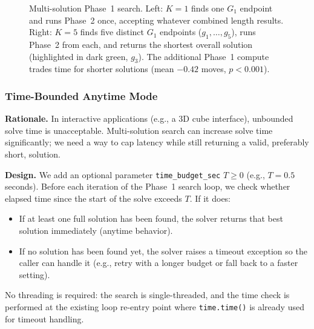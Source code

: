 \documentclass[conference]{IEEEtran}
\begin{document}
\begin{figure}[t]
\caption{Multi-solution Phase~1 search. Left: $K{=}1$ finds one $G_1$ endpoint and runs Phase~2 once, accepting whatever combined length results. Right: $K{=}5$ finds five distinct $G_1$ endpoints ($g_1,\ldots,g_5$), runs Phase~2 from each, and returns the shortest overall solution (highlighted in dark green, $g_3$). The additional Phase~1 compute trades time for shorter solutions (mean $-0.42$ moves, $p < 0.001$).}
\label{fig:multi-solution}
\end{figure}

\subsubsection{Time-Bounded Anytime Mode}
\label{sec:anytime}

\textbf{Rationale.} In interactive applications (e.g., a 3D cube interface), unbounded solve time is unacceptable. Multi-solution search can increase solve time significantly; we need a way to cap latency while still returning a valid, preferably short, solution.

\textbf{Design.} We add an optional parameter \texttt{time\_budget\_sec} $T \geq 0$ (e.g., $T = 0.5$ seconds). Before each iteration of the Phase~1 search loop, we check whether elapsed time since the start of the solve exceeds $T$. If it does:
\begin{itemize}
  \item If at least one full solution has been found, the solver returns that best solution immediately (anytime behavior).
  \item If no solution has been found yet, the solver raises a timeout exception so the caller can handle it (e.g., retry with a longer budget or fall back to a faster setting).
\end{itemize}
No threading is required: the search is single-threaded, and the time check is performed at the existing loop re-entry point where \texttt{time.time()} is already used for timeout handling.
\end{document}
